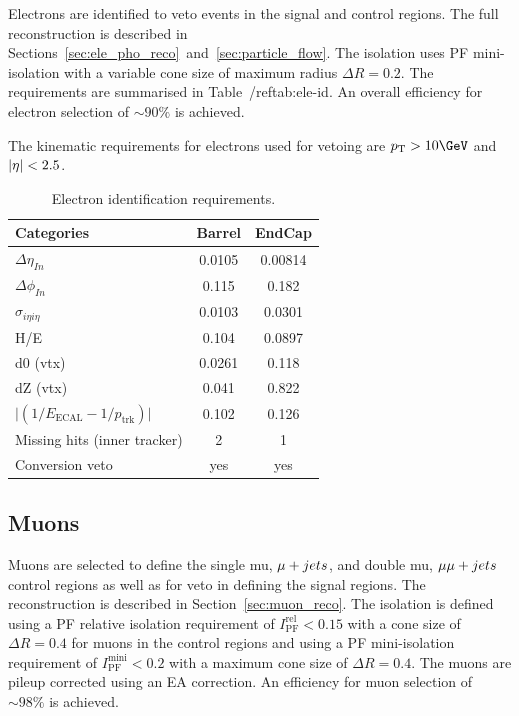 Electrons are identified to veto events in the signal and control regions. The full reconstruction is described in
Sections~\ref{sec:ele_pho_reco}~and~\ref{sec:particle_flow}. The isolation uses PF mini-isolation 
with a variable cone size of maximum radius $\Delta R = 0.2$. The requirements are summarised in 
Table~/ref{tab:ele-id}. An overall efficiency for electron selection of $\sim90\%$ is achieved.

The kinematic requirements for electrons used for vetoing are $\pt > 10\GeV$ and $|\eta| < 2.5$.
\begin{table}[h!]
  \caption{Electron identification requirements.\label{tab:ele-id}}
  \centering
  \footnotesize
  \begin{tabular}{ lcc }
    \hline
    \hline
    Categories                                               & Barrel    & EndCap    \\
    \hline
    $\Delta \eta_{In}$                                       & 0.0105   & 0.00814  \\
    $\Delta \phi_{In}$                                       & 0.115    & 0.182  \\
    $\sigma_{i\eta i\eta}$                                   & 0.0103    & 0.0301  \\
    H/E                                                      & 0.104    & 0.0897   \\
    d0 (vtx)                                                 & 0.0261    & 0.118  \\
    dZ (vtx)                                                 & 0.041    & 0.822  \\
    $\lvert(1/E_{\textrm{ECAL}} - 1/p_{\textrm{trk}})\rvert$ & 0.102     & 0.126  \\
    Missing hits (inner tracker)                             & 2         & 1         \\
    Conversion veto                                          & yes       & yes   \\
    \hline
    \hline
  \end{tabular}
  \end{table}
\subsection{Muons}

Muons are selected to define the single mu, $\mu + jets$, and double mu, $\mu\mu + jets$ control regions as well as 
for veto in defining the signal regions. The reconstruction is described in Section~\ref{sec:muon_reco}.
The isolation is defined using a PF relative isolation requirement of $I_{\text{PF}}^{\text{rel}} < 0.15$ 
with a cone size of $\Delta R = 0.4$ for muons in the control regions and using a PF mini-isolation requirement of
$I_{\text{PF}}^{\text{mini}} < 0.2$ with a maximum cone size of $\Delta R = 0.4$. The muons are pileup corrected
using an EA correction. An efficiency for muon selection of $\sim98\%$ is achieved.

